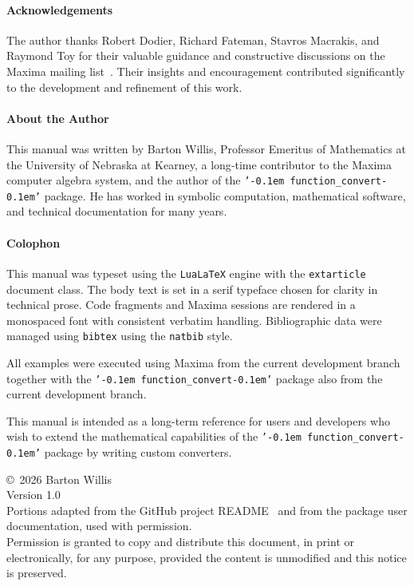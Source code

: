 \documentclass[12pt,fleqn]{extarticle}
\newcommand{\ttq}[1]{\texttt{'\kern-0.1em #1\kern-0.1em'}}
\newcommand{\funconvert}{\ttq{function\_convert}{ }}
\begin{document}
\paragraph*{Acknowledgements} The author thanks Robert Dodier, Richard Fateman, Stavros Macrakis, and Raymond Toy for their valuable guidance and constructive discussions on
the Maxima mailing list~\cite{maxima-list}. Their insights and
encouragement contributed significantly to the development and
refinement of this work.




%





\paragraph*{About the Author}
This manual was written by Barton Willis, Professor Emeritus of Mathematics at the
University of Nebraska at Kearney, a long‑time contributor to the Maxima computer
algebra system, and the author of the \funconvert package. He has worked in symbolic
computation, mathematical software, and technical documentation for many years.


\paragraph*{Colophon} This manual was typeset using the \texttt{LuaLaTeX}  engine with the
\texttt{extarticle} document class. The body text is set in a serif typeface chosen for
clarity in technical prose. Code fragments and Maxima sessions
are rendered in a monospaced font with consistent verbatim handling. Bibliographic data were managed using \texttt{bibtex} using the \texttt{natbib} style.

All examples were executed using Maxima from the current development branch together with the \funconvert package also from the current development branch.

This manual is intended as a long-term reference for users and
developers who wish to extend the mathematical capabilities of the
\funconvert package by writing custom converters.

\begin{flushleft}
\copyright\ 2026 Barton Willis\\
Version 1.0\\
Portions adapted from the GitHub project README~\cite{willis-function-convert}
and from the package user documentation, used with permission.\\[1ex]
Permission is granted to copy and distribute this document, in print or
electronically, for any purpose, provided the content is unmodified and
this notice is preserved.
\end{flushleft}
\end{document}
